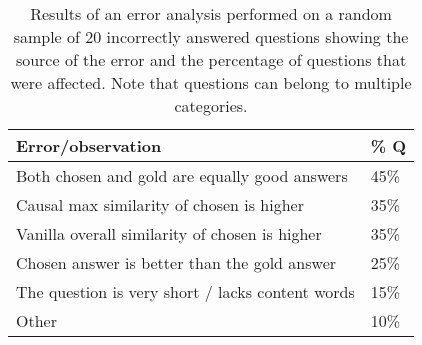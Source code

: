 %
%

\begin{table}[t!]
\begin{center}
\begin{footnotesize}
\begin{tabular}{ll}
\hline
Error/observation 	& \% Q \\
\hline
Both chosen and gold are equally good answers 	& 	45\% \\ 
Causal max similarity of chosen is higher		&	35\% \\
Vanilla overall similarity of chosen is higher	&	35\% \\
Chosen answer is better than the gold answer		&	25\% \\
The question is very short / lacks content words	&	15\%	 \\
Other 											&	10\% \\
\end{tabular}
\end{footnotesize}

\caption{{\footnotesize Results of an error analysis performed on a random sample of 20 incorrectly answered questions showing the source of the error and the percentage of questions that were affected. Note that questions can belong to multiple categories. }} 
\label{tab:ea}
\vspace{-8mm}
\end{center}
\end{table}


